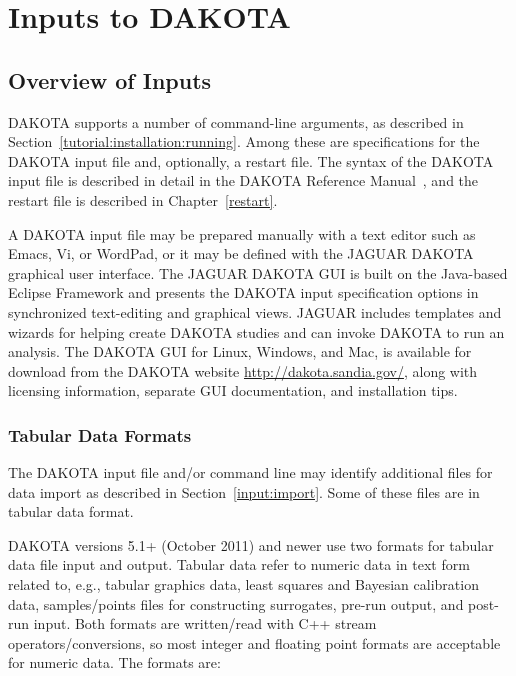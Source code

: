 \chapter{Inputs to DAKOTA}\label{input}

\section{Overview of Inputs}\label{input:overview}

DAKOTA supports a number of command-line arguments, as described in
Section~\ref{tutorial:installation:running}.  Among these are
specifications for the DAKOTA input file and, optionally, a restart
file.  The syntax of the DAKOTA input file is described in detail in
the DAKOTA Reference Manual~\cite{RefMan}, and the restart file is
described in Chapter~\ref{restart}.

A DAKOTA input file may be prepared manually with a text editor such
as Emacs, Vi, or WordPad, or it may be defined with the JAGUAR DAKOTA
graphical user interface.  The JAGUAR DAKOTA GUI is built on the
Java-based Eclipse Framework \cite{Eclipse} and presents the DAKOTA
input specification options in synchronized text-editing and graphical
views.  JAGUAR includes templates and wizards for helping create
DAKOTA studies and can invoke DAKOTA to run an analysis.  The DAKOTA
GUI for Linux, Windows, and Mac, is available for download from the
DAKOTA website \url{http://dakota.sandia.gov/}, along with licensing
information, separate GUI documentation, and installation tips.

\subsection{Tabular Data Formats}\label{input:tabularformat}

The DAKOTA input file and/or command line may identify additional
files for data import as described in Section~\ref{input:import}.
Some of these files are in tabular data format.

DAKOTA versions 5.1+ (October 2011) and newer use two formats for
tabular data file input and output.  Tabular data refer to numeric
data in text form related to, e.g., tabular graphics data, least
squares and Bayesian calibration data, samples/points files for
constructing surrogates, pre-run output, and post-run input.  Both
formats are written/read with C++ stream operators/conversions, so
most integer and floating point formats are acceptable for numeric
data.  The formats are:

